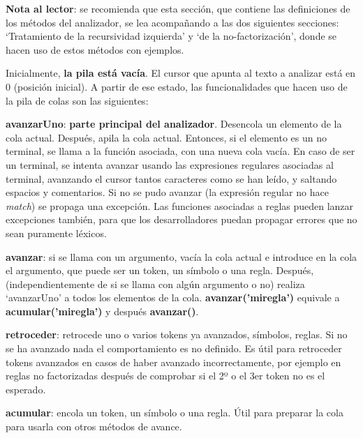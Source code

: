 \documentclass{report}
\begin{document}
	\vspace{10px}
	
	\textbf{Nota al lector}: se recomienda que esta sección, que contiene las definiciones de los métodos del analizador, se lea acompañando a las dos siguientes secciones: `Tratamiento de la recursividad izquierda' y `de la no-factorización', donde se hacen uso de estos métodos con ejemplos. 
	
	\vspace{10px}
	
	Inicialmente, \textbf{la pila está vacía}. El cursor que apunta al texto a analizar está en 0 (posición inicial). A partir de ese estado, las funcionalidades que hacen uso de la pila de colas son las siguientes:
	
	\vspace{10px}
	\noindent
	\textbf{avanzarUno}: \textbf{parte principal del analizador}. Desencola un elemento de la cola actual. Después, apila la cola actual. Entonces, si el elemento es un no terminal, se llama a la función asociada, con una nueva cola vacía. En caso de ser un terminal, se intenta avanzar usando las expresiones regulares asociadas al terminal, avanzando el cursor tantos caracteres como se han leído, y saltando espacios y comentarios. Si no se pudo avanzar (la expresión regular no hace \textit{match}) se propaga una excepción. Las funciones asociadas a reglas pueden lanzar excepciones también, para que los desarrolladores puedan propagar errores que no sean puramente léxicos.
	
	\vspace{10px}
	\noindent
	\textbf{avanzar}: si se llama con un argumento, vacía la cola actual e introduce en la cola el argumento, que puede ser un token, un símbolo o una regla. Después, (independientemente de si se llama con algún argumento o no) realiza `avanzarUno' a todos los elementos de la cola.  \textbf{avanzar('miregla')} equivale a \textbf{acumular('miregla')} y después \textbf{avanzar()}.
	
	\vspace{10px}
	\noindent
	\textbf{retroceder}: retrocede uno o varios tokens ya avanzados, símbolos, reglas. Si no se ha avanzado nada el comportamiento es no definido. Es útil para retroceder tokens avanzados en casos de haber avanzado incorrectamente, por ejemplo en reglas no factorizadas después de comprobar si el 2º o el 3er token no es el esperado. 
	
	\vspace{10px}
	\noindent
	\textbf{acumular}: encola un token, un símbolo o una regla. Útil para preparar la cola para usarla con otros métodos de avance.
	
\end{document}
